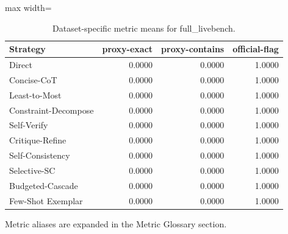 \documentclass[10pt,twocolumn]{article}
\begin{document}
\begin{table}[t]
\centering
\caption{Dataset-specific metric means for full\_livebench.}
\label{tab:full_livebench_dataset}
\begin{adjustbox}{max width=\textwidth}
\begin{tabular}{lrrr}
\toprule
Strategy & proxy-exact & proxy-contains & official-flag \\
\midrule
Direct & 0.0000 & 0.0000 & 1.0000 \\
Concise-CoT & 0.0000 & 0.0000 & 1.0000 \\
Least-to-Most & 0.0000 & 0.0000 & 1.0000 \\
Constraint-Decompose & 0.0000 & 0.0000 & 1.0000 \\
Self-Verify & 0.0000 & 0.0000 & 1.0000 \\
Critique-Refine & 0.0000 & 0.0000 & 1.0000 \\
Self-Consistency & 0.0000 & 0.0000 & 1.0000 \\
Selective-SC & 0.0000 & 0.0000 & 1.0000 \\
Budgeted-Cascade & 0.0000 & 0.0000 & 1.0000 \\
Few-Shot Exemplar & 0.0000 & 0.0000 & 1.0000 \\
\bottomrule
\end{tabular}
\end{adjustbox}
\vspace{2pt}\parbox{0.98\textwidth}{\footnotesize Metric aliases are expanded in the Metric Glossary section.}
\end{table}
\end{document}
